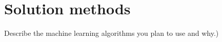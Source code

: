 \section{Solution methods}
\label{sec:methods}

Describe the machine learning algorithms you plan to use and why.)
